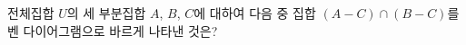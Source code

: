 전체집합 $U$의 세 부분집합 $A$, $B$, $C$에 대하여 다음 중 집합 $(A-C)\cap(B-C)$를 벤 다이어그램으로 바르게 나타낸 것은?
\begin{choicesii}{}{}{}{}{}\end{choicesii}
